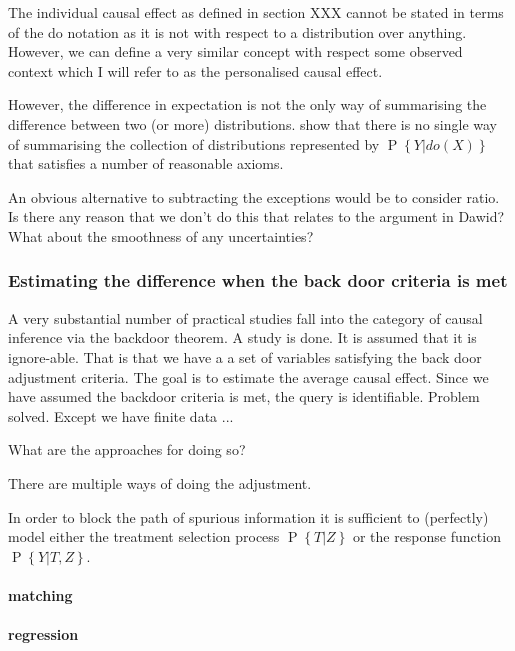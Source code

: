 \documentclass[11pt,a4paper,oneside]{book}
\renewcommand{\P}[1]{\operatorname{P}\left\{#1\right\}}
\theoremstyle{plain}
\theoremstyle{definition}
\begin{document}

The individual causal effect as defined in section XXX cannot be stated in terms of the do notation as it is not with respect to a distribution over anything. However, we can define a very similar concept with respect some observed context which I will refer to as the personalised causal effect. 


However, the difference in expectation is not the only way of summarising the difference between two (or more) distributions. \citep{Janzing2013} show that there is no single way of summarising the collection of distributions represented by $\P{Y|do(X)}$ that satisfies a number of reasonable axioms. 

An obvious alternative to subtracting the exceptions would be to consider ratio. Is there any reason that we don't do this that relates to the argument in Dawid? What about the smoothness of any uncertainties?

\subsubsection{Estimating the difference when the back door criteria is met}

A very substantial number of practical studies fall into the category of causal inference via the backdoor theorem. A study is done. It is assumed that it is ignore-able. That is that we have a a set of variables satisfying the back door adjustment criteria. The goal is to estimate the average causal effect. Since we have assumed the backdoor criteria is met, the query is identifiable. Problem solved. Except we have finite data ...

What are the approaches for doing so? 

There are multiple ways of doing the adjustment. 

In order to block the path of spurious information it is sufficient to (perfectly) model either the treatment selection process $\P{T|Z}$ or the response function $\P{Y|T,Z}$. 

\paragraph*{matching}

\paragraph*{regression}
\end{document}
